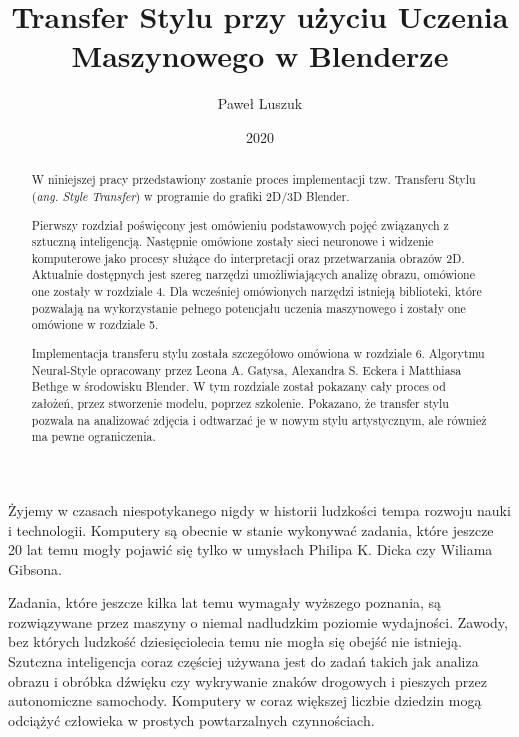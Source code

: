 \documentclass[brudnopis]{xmgr}
\author   {Paweł Luszuk}
\title    {Transfer Stylu przy użyciu Uczenia Maszynowego w Blenderze}
\date     {2020}
\begin{document}
\begin{abstract}

W niniejszej pracy przedstawiony zostanie proces implementacji tzw. Transferu Stylu (\textit{ang. Style Transfer}) w programie do grafiki 2D/3D Blender.

Pierwszy rozdział poświęcony jest omówieniu podstawowych pojęć związanych z sztuczną inteligencją. Następnie omówione zostały sieci neuronowe i widzenie komputerowe jako procesy służące do interpretacji oraz przetwarzania obrazów 2D. Aktualnie dostępnych jest szereg narzędzi umożliwiających analizę obrazu, omówione one zostały w rozdziale 4. Dla wcześniej omówionych narzędzi istnieją biblioteki, które pozwalają na wykorzystanie pełnego potencjału uczenia maszynowego i zostały one omówione w rozdziale 5.

Implementacja transferu stylu została szczegółowo omówiona w rozdziale 6. Algorytmu Neural-Style opracowany przez Leona A. Gatysa, Alexandra S. Eckera i Matthiasa Bethge w środowisku Blender. W tym rozdziale został pokazany cały proces od założeń, przez stworzenie modelu, poprzez szkolenie. Pokazano, że transfer stylu pozwala na analizować zdjęcia i odtwarzać je w nowym stylu artystycznym, ale również ma pewne ograniczenia. 


\end{abstract}


\maketitle

\introduction

Żyjemy w czasach niespotykanego nigdy w historii ludzkości tempa rozwoju nauki i technologii. Komputery są obecnie w stanie wykonywać zadania, które jeszcze 20 lat temu mogły pojawić się tylko w umysłach Philipa K. Dicka czy Wiliama Gibsona.

Zadania, które jeszcze kilka lat temu wymagały wyższego poznania, są rozwiązywane przez maszyny o niemal nadludzkim poziomie wydajności. Zawody, bez których ludzkość dziesięciolecia temu nie mogła się obejść nie istnieją. Szutczna inteligencja coraz częściej używana jest do zadań takich jak analiza obrazu i obróbka dźwięku czy wykrywanie znaków drogowych i pieszych przez autonomiczne samochody. Komputery w coraz większej liczbie dziedzin mogą odciążyć człowieka w prostych powtarzalnych czynnościach.
\end{document}
